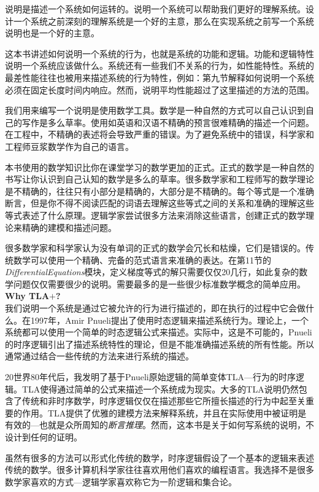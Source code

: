 \documentclass[utf8]{book}
\begin{document}
说明是描述一个系统如何运转的。说明一个系统可以帮助我们更好的理解系统。设计一个系统之前深刻的理解系统是一个好的主意，那么在实现系统之前写一个系统说明也是一个好的主意。

这本书讲述如何说明一个系统的行为，也就是系统的功能和逻辑。功能和逻辑特性说明一个系统应该做什么。系统还有一些我们不关系的行为，如性能特性。系统的最差性能往往也被用来描述系统的行为特性，例如：第九节解释如何说明一个系统必须在固定长度时间内响应。然而，说明平均性能超过了这里描述的方法的范围。

我们用来编写一个说明是使用数学工具。数学是一种自然的方式可以自己认识到自己的写作是多么草率。使用如英语和汉语不精确的预言很难精确的描述一个问题。在工程中，不精确的表述将会导致严重的错误。为了避免系统中的错误，科学家和工程师豆浆数学作为自己的语言。

本书使用的数学知识比你在课堂学习的数学更加的正式。正式的数学是一种自然的书写让你认识到自己认知的数学是多么的草率。很多数学家和工程师写的数学理论是不精确的，往往只有小部分是精确的，大部分是不精确的。每个等式是一个准确断言，但是你不得不阅读匹配的词语去理解这些等式之间的关系和准确的理解这些等式表述了什么原理。逻辑学家尝试很多方法来消除这些语言，创建正式的数学理论来精确的建模和描述问题。

很多数学家和科学家认为没有单词的正式的数学会冗长和枯燥，它们是错误的。传统数学可以使用一个精确、完备的范式语言来准确的表达。在第11节的\textit{DifferentialEquations}模块，定义梯度等式的解只需要仅仅20几行，如此复杂的数学问题仅仅需要很少的说明。需要最多的是一些很少标准数学概念的简单应用。\\

\textbf{\large{Why TLA$+$?}}\\

我们说明一个系统是通过它被允许的行为进行描述的，即在执行的过程中它会做什么。在1997年，Amir Pnueli提出了使用时态逻辑来描述系统行为。理论上，一个系统都可以使用一个简单的时态逻辑公式来描述。实际中，这是不可能的，Pnueli的时序逻辑引出了描述系统特性的理论，但是不能准确描述系统的所有性能。所以通常通过结合一些传统的方法来进行系统的描述。

20世界80年代后，我发明了基于Pnueli原始逻辑的简单变体TLA---行为的时序逻辑。TLA使得通过简单的公式来描述一个系统成为现实。大多的TLA说明仍然包含了传统和非时序数学，时序逻辑仅仅在描述那些它所擅长描述的行为中起至关重要的作用。TLA提供了优雅的建模方法来解释系统，并且在实际使用中被证明是有效的---也就是众所周知的\textit{断言推理}。然而，这本书是关于如何写系统的说明，不设计到任何的证明。

虽然有很多的方法可以形式化传统的数学，时序逻辑假设了一个基本的逻辑来表述传统的数学。很多计算机科学家往往喜欢用他们喜欢的编程语言。我选择不是很多数学家喜欢的方式---逻辑学家喜欢称它为一阶逻辑和集合论。
\end{document}
